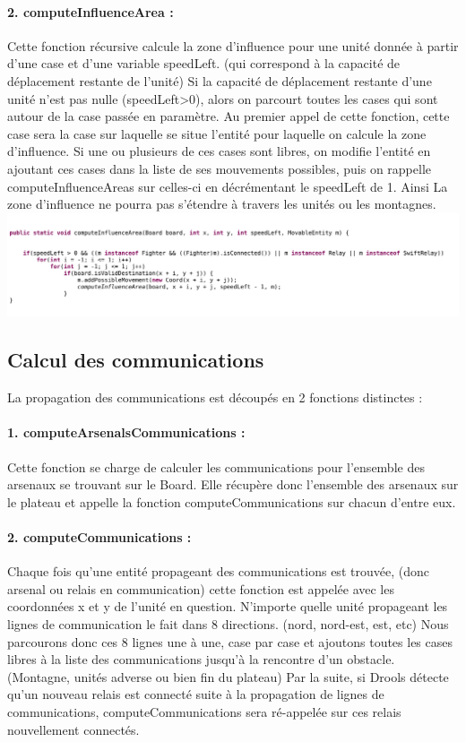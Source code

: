 			\paragraph{2. computeInfluenceArea : }
			Cette fonction récursive calcule la zone d'influence pour une unité donnée à partir d'une case et d'une variable speedLeft. 
			(qui correspond à la capacité de déplacement restante de l'unité)
			Si la capacité de déplacement restante d'une unité n'est pas nulle (speedLeft\textgreater0), alors on parcourt toutes les cases 
			qui sont autour de la case passée en paramètre. 
			Au premier appel de cette fonction, cette case sera la case sur laquelle se situe l'entité pour laquelle on calcule la zone d'influence.
			Si une ou plusieurs de ces cases sont libres, on modifie l'entité en ajoutant ces cases dans la liste de ses mouvements possibles, 
			puis on rappelle computeInfluenceAreas sur celles-ci en décrémentant le speedLeft de 1.
			Ainsi La zone d'influence ne pourra pas s'étendre à travers les unités ou les montagnes.\\
			\includegraphics[scale=0.4]{images/implementation/computeInfluenceArea.png}
		
		\subsection{Calcul des communications}
		
			La propagation des communications est découpés en 2 fonctions distinctes :
			
			\paragraph{1. computeArsenalsCommunications : }
			Cette fonction se charge de calculer les communications pour l'ensemble des arsenaux se trouvant sur le Board.
			Elle récupère donc l'ensemble des arsenaux sur le plateau et appelle la fonction computeCommunications sur chacun d'entre eux.
			
			\paragraph{2. computeCommunications : }
			Chaque fois qu'une entité propageant des communications est trouvée, (donc arsenal ou relais en communication) cette fonction est appelée
			avec les coordonnées x et y de l'unité en question.
			N'importe quelle unité propageant les lignes de communication le fait dans 8 directions. (nord, nord-est, est, etc)
			Nous parcourons donc ces 8 lignes une à une, case par case et ajoutons toutes les cases libres à la liste des communications jusqu'à
			la rencontre d'un obstacle. (Montagne, unités adverse ou bien fin du plateau)
			Par la suite, si Drools détecte qu'un nouveau relais est connecté suite à la propagation de lignes de communications, computeCommunications
			sera ré-appelée sur ces relais nouvellement connectés.
		

